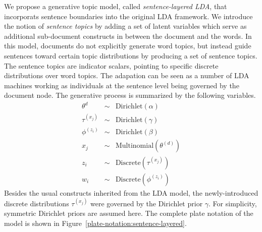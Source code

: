 We propose a generative topic model, called {\it sentence-layered LDA}, that
incorporats sentence boundaries into the original LDA framework.  We introduce
the notion of {\it sentence topics} by adding a set of latent variables which
serve as additional sub-document constructs in between the document and the
words.  In this model, documents do not explicitly generate word topics, but
instead guide sentences toward certain topic distributions by producing a set
of sentence topics.  The sentence topics are indicator scalars, pointing to
specific discrete distributions over word topics.  The adapation can be seen as
a number of LDA machines working as individuals at the sentence level being
governed by the document node.  The generative process is summarized by the
following variables.  
\begin{eqnarray*}
  \theta^{d} &\sim& \mathrm{Dirichlet}(\alpha) \\
  \tau^{(x_j)} &\sim& \mathrm{Dirichlet}(\gamma) \\
  \phi^{(z_i)} &\sim& \mathrm{Dirichlet}(\beta) \\
  x_j &\sim& \mathrm{Multinomial}(\theta^{(d)}) \\
  z_i &\sim& \mathrm{Discrete}(\tau^{(x_j)}) \\
  w_i &\sim& \mathrm{Discrete}(\phi^{(z_i)})
\end{eqnarray*}
Besides the usual constructs inherited from the LDA model, the newly-introduced
discrete distributions $\tau^{(x_j)}$ were governed by the Dirichlet prior
$\gamma$.   For simplicity, symmetric Dirichlet priors are assumed here.  The
complete plate notation of the model is shown in
Figure~\ref{plate-notation:sentence-layered}.

